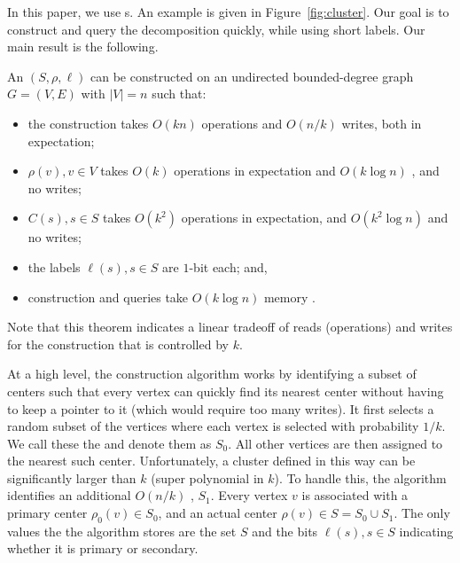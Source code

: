 In this paper, we use \implicit{}s.  An example is given in
Figure~\ref{fig:cluster}.  Our goal is to construct and query the
decomposition quickly, while using short labels.  Our main result is
the following.

\begin{theorem}\label{thm:mainimp}
An \implicit{} $(S,\rho,\ell)$ can be constructed on an
undirected bounded-degree graph $G = (V,E)$ with $|V| = n$ such that:
\begin{itemize}
\setlength{\itemsep}{1pt}
\setlength{\parskip}{0pt}
\setlength{\parsep}{0pt}
\item the construction takes
$O(kn)$ operations and $O(n/k)$ writes, both in expectation;
\item  $\rho(v), v \in V$ takes $O(k)$ operations in expectation
and $O(k \log n)$ \whp{}, and no writes;
\item $C(s), s \in S$ takes $O(k^2)$ operations in expectation,
  and $O(k^2 \log n)$ \whp{} and no writes;
\item the labels $\ell(s), s \in S$ are $1$-bit each; and,
\item construction and queries take $O(k \log n)$ \local{}
  memory \whp{}.
\end{itemize}
\end{theorem}
\noindent
Note that this theorem indicates a linear tradeoff of reads
(operations) and writes for the construction that is controlled by
$k$.

At a high level, the construction algorithm works by identifying a
subset of centers such that every vertex can quickly find its nearest
center without having to keep a pointer to it (which would require too
many writes).  It first selects a random subset of the vertices where
each vertex is selected with probability $1/k$.  We call these the
 and denote them as $S_0$.  All other vertices
are then assigned to the nearest such center.  Unfortunately, a
cluster defined in this way can be significantly larger than $k$
(super polynomial in $k$).  To handle this, the algorithm identifies an
additional $O(n/k)$ , $S_1$.  Every vertex $v$
is associated with a primary center $\rho_0(v) \in S_0$, and an actual
center $\rho(v) \in S = S_0 \cup S_1$.  The only values the the
algorithm stores are the set $S$ and the bits $\ell(s), s \in S$
indicating whether it is primary or secondary.

\newcommand{\p}{\mb{SP}}

